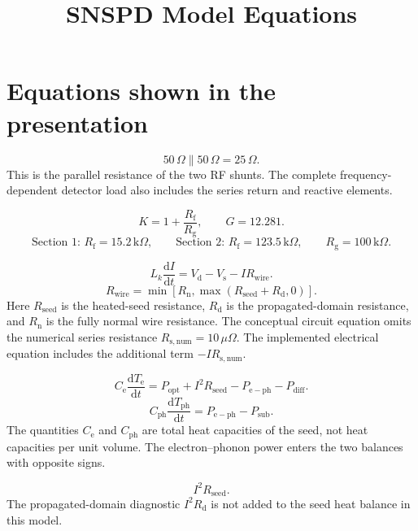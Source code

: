 \documentclass[11pt]{article}
\title{SNSPD Model Equations}
\author{}
\date{}
\begin{document}
\maketitle

\section*{Equations shown in the presentation}
\[
50\,\Omega\parallel50\,\Omega=25\,\Omega .
\]
This is the parallel resistance of the two RF shunts. The complete
frequency-dependent detector load also includes the series return and
reactive elements.

\[
K=1+\frac{R_{\mathrm{f}}}{R_{\mathrm{g}}},
\qquad G=12.281 .
\]
\[
\text{Section 1: }R_{\mathrm{f}}=15.2\,\mathrm{k}\Omega,
\qquad
\text{Section 2: }R_{\mathrm{f}}=123.5\,\mathrm{k}\Omega,
\qquad R_{\mathrm{g}}=100\,\mathrm{k}\Omega .
\]

\[
L_k\frac{\mathrm{d}I}{\mathrm{d}t}
=V_{\mathrm{d}}-V_{\mathrm{s}}-I R_{\mathrm{wire}} .
\]
\[
R_{\mathrm{wire}}
=\min\!\left[R_{\mathrm{n}},
\max\!\left(R_{\mathrm{seed}}+R_{\mathrm{d}},0\right)\right] .
\]
Here $R_{\mathrm{seed}}$ is the heated-seed resistance,
$R_{\mathrm{d}}$ is the propagated-domain resistance, and
$R_{\mathrm{n}}$ is the fully normal wire resistance.
The conceptual circuit equation omits the numerical series resistance
$R_{\mathrm{s,num}}=10\,\mu\Omega$. The implemented electrical equation
includes the additional term $-I R_{\mathrm{s,num}}$.


\[
C_{\mathrm{e}}\frac{\mathrm{d}T_{\mathrm{e}}}{\mathrm{d}t}
=P_{\mathrm{opt}}+I^2R_{\mathrm{seed}}
-P_{\mathrm{e-ph}}-P_{\mathrm{diff}} .
\]
\[
C_{\mathrm{ph}}\frac{\mathrm{d}T_{\mathrm{ph}}}{\mathrm{d}t}
=P_{\mathrm{e-ph}}-P_{\mathrm{sub}} .
\]
The quantities $C_{\mathrm{e}}$ and $C_{\mathrm{ph}}$ are total heat
capacities of the seed, not heat capacities per unit volume.
The electron--phonon power enters the two balances with opposite signs.

\[
I^2R_{\mathrm{seed}} .
\]
The propagated-domain diagnostic $I^2R_{\mathrm{d}}$ is not added to
the seed heat balance in this model.
\end{document}
